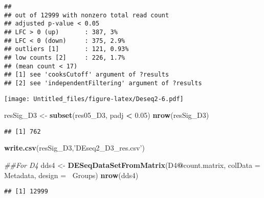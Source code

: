 \documentclass[]{article}
\newenvironment{Shaded}{\begin{snugshade}}{\end{snugshade}}
\newcommand{\CommentTok}[1]{\textcolor[rgb]{0.56,0.35,0.01}{\textit{#1}}}
\newcommand{\DataTypeTok}[1]{\textcolor[rgb]{0.13,0.29,0.53}{#1}}
\newcommand{\DecValTok}[1]{\textcolor[rgb]{0.00,0.00,0.81}{#1}}
\newcommand{\FloatTok}[1]{\textcolor[rgb]{0.00,0.00,0.81}{#1}}
\newcommand{\KeywordTok}[1]{\textcolor[rgb]{0.13,0.29,0.53}{\textbf{#1}}}
\newcommand{\NormalTok}[1]{#1}
\newcommand{\OperatorTok}[1]{\textcolor[rgb]{0.81,0.36,0.00}{\textbf{#1}}}
\newcommand{\StringTok}[1]{\textcolor[rgb]{0.31,0.60,0.02}{#1}}
\begin{document}
\begin{verbatim}
## 
## out of 12999 with nonzero total read count
## adjusted p-value < 0.05
## LFC > 0 (up)       : 387, 3%
## LFC < 0 (down)     : 375, 2.9%
## outliers [1]       : 121, 0.93%
## low counts [2]     : 226, 1.7%
## (mean count < 17)
## [1] see 'cooksCutoff' argument of ?results
## [2] see 'independentFiltering' argument of ?results
\end{verbatim}

\begin{Shaded}
\end{Shaded}

\texttt{[image: Untitled\_files/figure-latex/Deseq2-6.pdf]}

\begin{Shaded}
\begin{Highlighting}[]
\NormalTok{resSig_D3 <-}\StringTok{ }\KeywordTok{subset}\NormalTok{(res05_D3, padj }\OperatorTok{<}\StringTok{ }\FloatTok{0.05}\NormalTok{)}
\KeywordTok{nrow}\NormalTok{(resSig_D3)}
\end{Highlighting}
\end{Shaded}

\begin{verbatim}
## [1] 762
\end{verbatim}

\begin{Shaded}
\begin{Highlighting}[]
\KeywordTok{write.csv}\NormalTok{(resSig_D3,}\StringTok{'DEseq2_D3_res.csv'}\NormalTok{)}


\CommentTok{##For D4}
\NormalTok{dds4 <-}\StringTok{ }\KeywordTok{DESeqDataSetFromMatrix}\NormalTok{(D4}\OperatorTok{@}\NormalTok{count.matrix, }
                              \DataTypeTok{colData =}\NormalTok{ Metadata, }
                              \DataTypeTok{design =} \OperatorTok{~}\NormalTok{Groups)}
\KeywordTok{nrow}\NormalTok{(dds4) }
\end{Highlighting}
\end{Shaded}

\begin{verbatim}
## [1] 12999
\end{verbatim}
\end{document}
